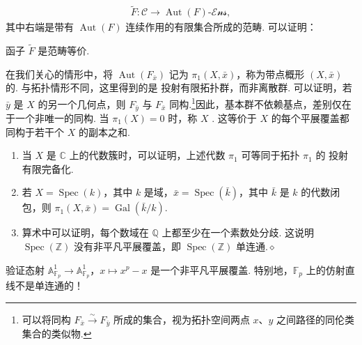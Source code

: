\begin{align*}
\widetilde F:\mathcal C\longrightarrow\operatorname{Aut}(F)\text{-}\mathcal{Ens},
\end{align*}
其中右端是带有 $\operatorname{Aut}(F)$ 连续作用的有限集合所成的范畴. 可以证明：
\begin{proposition}\label{item:ag-3-3-19}
函子 $\widetilde F$ 是范畴等价.
\end{proposition}
在我们关心的情形中，将 $\operatorname{Aut}(F_{\bar x})$ 记为 $\pi_1(X,\bar x)$，称为带点概形 $(X,\bar x)$ 的. 与拓扑情形不同，这里得到的是 投射有限拓扑群，而非离散群. 可以证明，若 $\bar y$ 是 $X$ 的另一个几何点，则 $F_{\bar y}$ 与 $F_{\bar x}$ 同构.\footnote{可以将同构 $F_{\bar x}\xrightarrow\sim F_{\bar y}$ 所成的集合，视为拓扑空间两点 $x$、$y$ 之间路径的同伦类集合的类似物.}因此，基本群不依赖基点，差别仅在于一个非唯一的同构. 当 $\pi_1(X)=0$ 时，称 $X$ . 这等价于 $X$ 的每个平展覆盖都同构于若干个 $X$ 的副本之和.
\begin{example}\label{item:ag-3-3-20}
\begin{enumerate}[label=(\roman*)]
\item 当 $X$ 是 $\mathbb C$ 上的代数簇时，可以证明，上述代数 $\pi_1$ 可等同于拓扑 $\pi_1$ 的 投射有限完备化.
\item 若 $X=\operatorname{Spec}(k)$，其中 $k$ 是域，$\bar x=\operatorname{Spec}(\bar k)$，其中 $\bar k$ 是 $k$ 的代数闭包，则 $\pi_1(X,\bar x)=\operatorname{Gal}(\bar k/k)$.
\item 算术中可以证明，每个数域在 $\mathbb Q$ 上都至少在一个素数处分歧. 这说明 $\operatorname{Spec}(\mathbb Z)$ 没有非平凡平展覆盖，即 $\operatorname{Spec}(\mathbb Z)$ 单连通.\unskip\nobreak\hfill\ensuremath{\diamond}
\end{enumerate}
\renewcommand{\envenddiamond}{}
\end{example}
\begin{exercise}\label{item:ag-3-3-21}
验证态射 $\mathbb A_{\mathbb F_p}^1\longrightarrow\mathbb A_{\mathbb F_p}^1$，$x\mapsto x^p-x$ 是一个非平凡平展覆盖. 特别地，$\mathbb F_p$ 上的仿射直线不是单连通的！
\end{exercise}